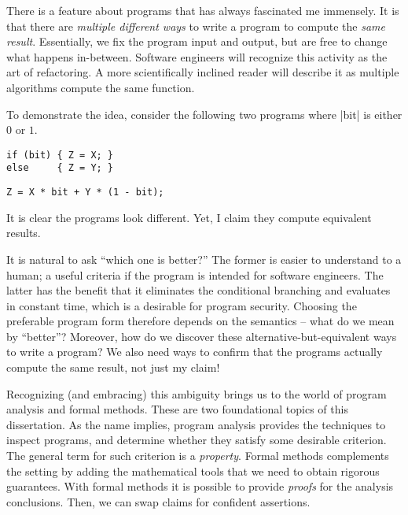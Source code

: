 There is a feature about programs that has always fascinated me immensely.
It is that there are \emph{multiple different ways} to write a program to compute the \emph{same result}.
Essentially, we fix the program input and output, but are free to change what happens in-between.
Software engineers will recognize this activity as the art of refactoring.
A more scientifically inclined reader will describe it as multiple algorithms compute the same function.

To demonstrate the idea, consider the following two programs where \pr|bit| is either \(0\) or \(1\).
\begin{center}
\begin{minipage}{.3\textwidth}
\begin{lstlisting}[nolol,label={p1},frame=none,numbers=none,aboveskip=0pt,belowskip=0pt]
if (bit) { Z = X; }
else     { Z = Y; }
\end{lstlisting}
\end{minipage}\hspace{3em}%
\begin{minipage}{.4\textwidth}
\begin{lstlisting}[nolol,label={p2},frame=none,numbers=none,aboveskip=0pt,belowskip=0pt]
Z = X * bit + Y * (1 - bit);
\end{lstlisting}
\end{minipage}
\end{center}
It is clear the programs look different. 
Yet, I claim they compute equivalent results.

It is natural to ask \enquote{which one is better?}
The former is {easier} to understand {to a human};
a useful criteria if the program is intended for software engineers.
The latter has the benefit that it eliminates the conditional branching and evaluates in {constant time}, which is a desirable for program security.
Choosing the preferable program form therefore depends on the semantics -- what do we mean by \enquote{better}?
Moreover, how do we discover these alternative-but-equivalent ways to write a program?
We also need ways to confirm that the programs {actually} compute the same result, not just my claim!
 
Recognizing (and {embracing}) this ambiguity brings us to the world of program analysis and formal methods.
These are two foundational topics of this dissertation.
As the name implies, program analysis provides the techniques to inspect programs, and determine whether they satisfy some desirable criterion.
The general term for such criterion is a \emph{property}.
Formal methods complements the setting by adding the mathematical tools that we need to obtain rigorous guarantees.
With formal methods it is possible to provide \emph{proofs} for the analysis conclusions. 
Then, we can swap claims for confident assertions.

